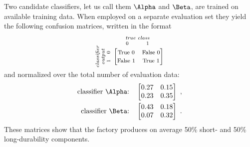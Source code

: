 \documentclass[\ifafour a4paper,12pt,\else a5paper,10pt,\fi%
onecolumn,oneside,article,%
british%
]{memoir}
\theoremstyle{remark}
\theoremstyle{innote}
\renewcommand*{\|}[1][]{\nonscript\:#1\vert\nonscript\:\mathopen{}}
\begin{document}
Two candidate classifiers, let us call them $\Alpha$ and $\Beta$, are trained on available training data. When employed on a separate evaluation set they yield the following confusion matrices, written in the format
\begin{equation*}
  \rotatebox[origin=c]{90}{
    \clap{\textit{\parbox{5em}{\centering\scriptsize classifier\\output\\$1\quad 0$}}
    }}\ 
    \overbracket[0pt]{
      \begin{bmatrix}
    \text{\footnotesize True 0} & \text{\footnotesize False 0}\\
    \text{\footnotesize False 1} & \text{\footnotesize True 1}\\
      \end{bmatrix}}^{
      \clap{\textit{\parbox{6em}{\centering\scriptsize true class\\$0\hspace{3em}1$}}
    }}
\end{equation*}
and normalized over the total number of evaluation data:
\begin{align}
  \label{eq:CM_A}
\text{classifier $\Alpha$:}\quad  \begin{bmatrix}
    0.27 & 0.15 \\ 0.23 & 0.35
  \end{bmatrix}
\ ,
  \\
  \label{eq:CM_B}
\text{classifier $\Beta$:}\quad  \begin{bmatrix}
    0.43 & 0.18 \\ 0.07 & 0.32
  \end{bmatrix}
\ .
\end{align}
These matrices show that the factory produces on average 50\% short- and 50\% long-durability components.
\end{document}
